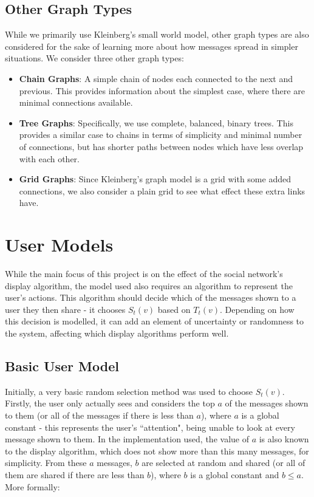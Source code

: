 \documentclass[bsc,frontabs,twoside,singlespacing,parskip,deptreport]{infthesis}     %
\begin{document}
\subsection{Other Graph Types}

While we primarily use Kleinberg's small world model, other graph types are also considered for the sake of learning more about how messages spread in simpler situations. We consider three other graph types:

\begin{itemize}
\item \textbf{Chain Graphs}: A simple chain of nodes each connected to the next and previous. This provides information about the simplest case, where there are minimal connections available.
\item \textbf{Tree Graphs}: Specifically, we use complete, balanced, binary trees. This provides a similar case to chains in terms of simplicity and minimal number of connections, but has shorter paths between nodes which have less overlap with each other.
\item \textbf{Grid Graphs}: Since Kleinberg's graph model is a grid with some added connections, we also consider a plain grid to see what effect these extra links have.
\end{itemize}

\section{User Models} \label{sec:user_models}
While the main focus of this project is on the effect of the social network's display algorithm, the model used also requires an algorithm to represent the user's actions. This algorithm should decide which of the messages shown to a user they then share - it chooses $S_{t}(v)$ based on $T_{t}(v)$. Depending on how this decision is modelled, it can add an element of uncertainty or randomness to the system, affecting which display algorithms perform well.

\subsection{Basic User Model}
Initially, a very basic random selection method was used to choose $S_{t}(v)$. Firstly, the user only actually sees and considers the top $a$ of the messages shown to them (or all of the messages if there is less than $a$), where $a$ is a global constant - this represents the user's ``attention", being unable to look at every message shown to them. In the implementation used, the value of $a$ is also known to the display algorithm, which does not show more than this many messages, for simplicity. From these $a$ messages, $b$ are selected at random and shared (or all of them are shared if there are less than $b$), where $b$ is a global constant and $b \le a$. More formally:
\end{document}
